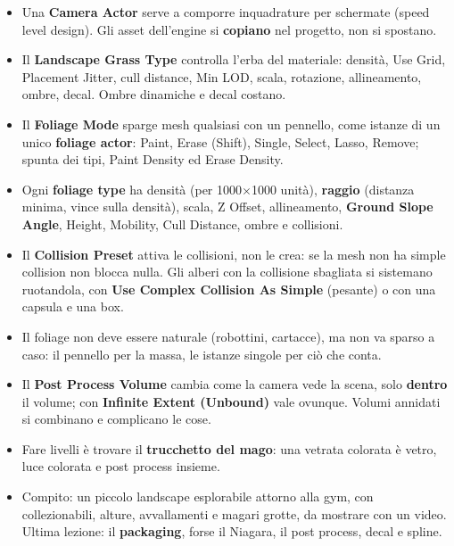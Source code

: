 \begin{itemize}
{        rays} si fanno anche con \textbf{Light Shaft Occlusion} e \textbf{Light Shaft Bloom}
        della directional light.
  \item Una \textbf{Camera Actor} serve a comporre inquadrature per schermate (speed level
        design). Gli asset dell'engine si \textbf{copiano} nel progetto, non si spostano.
  \item Il \textbf{Landscape Grass Type} controlla l'erba del materiale: densità, Use Grid,
        Placement Jitter, cull distance, Min LOD, scala, rotazione, allineamento, ombre,
        decal. Ombre dinamiche e decal costano.
  \item Il \textbf{Foliage Mode} sparge mesh qualsiasi con un pennello, come istanze di un
        unico \textbf{foliage actor}: Paint, Erase (Shift), Single, Select, Lasso, Remove;
        spunta dei tipi, Paint Density ed Erase Density.
  \item Ogni \textbf{foliage type} ha densità (per 1000$\times$1000 unità), \textbf{raggio}
        (distanza minima, vince sulla densità), scala, Z Offset, allineamento, \textbf{Ground
        Slope Angle}, Height, Mobility, Cull Distance, ombre e collisioni.
  \item Il \textbf{Collision Preset} attiva le collisioni, non le crea: se la mesh non ha
        simple collision non blocca nulla. Gli alberi con la collisione sbagliata si
        sistemano ruotandola, con \textbf{Use Complex Collision As Simple} (pesante) o con una
        capsula e una box.
  \item Il foliage non deve essere naturale (robottini, cartacce), ma non va sparso a caso:
        il pennello per la massa, le istanze singole per ciò che conta.
  \item Il \textbf{Post Process Volume} cambia come la camera vede la scena, solo
        \textbf{dentro} il volume; con \textbf{Infinite Extent (Unbound)} vale ovunque.
        Volumi annidati si combinano e complicano le cose.
  \item Fare livelli è trovare il \textbf{trucchetto del mago}: una vetrata colorata è vetro,
        luce colorata e post process insieme.
  \item Compito: un piccolo landscape esplorabile attorno alla gym, con collezionabili,
        alture, avvallamenti e magari grotte, da mostrare con un video. Ultima lezione: il
        \textbf{packaging}, forse il Niagara, il post process, decal e spline.
\end{itemize}
